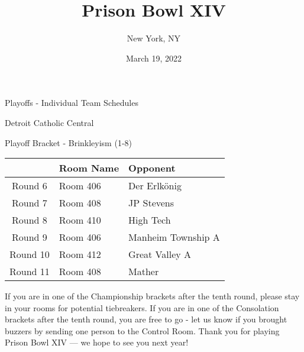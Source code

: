 \documentclass{article}%
\title{Prison Bowl XIV}%
\author{New York, NY}%
\date{March 19, 2022}%
\begin{document}
%
\normalsize%
%
\maketitle%
\vspace*{48pt}%
\begin{center}%
\begin{Huge}%
Playoffs {-} Individual Team Schedules%
\end{Huge}%
\end{center}%
\newpage%
\pagestyle{fancy}%
\fancyhf{}%
%
%
%
\begin{center}%
\begin{Huge}%
Detroit Catholic Central%
\end{Huge}%
\vspace*{12pt}%
\linebreak%
\begin{Large}%
Playoff Bracket {-} Brinkleyism (1{-}8)%
\end{Large}%
\end{center}%
\vspace*{4pt}%
%
\begin{tabularx}{\textwidth}{|c|Y|Y|}%
\hline%
&Room Name&Opponent\\%
\hline%
Round 6&Room 406&Der Erlkönig\\%
Round 7&Room 408&JP Stevens\\%
Round 8&Room 410&High Tech\\%
Round 9&Room 406&Manheim Township A\\%
Round 10&Room 412&Great Valley A\\%
Round 11&Room 408&Mather\\%
\hline%
\end{tabularx}%
\vspace*{30pt}%
\linebreak%
If you are in one of the Championship brackets after the tenth round, please stay in your rooms for potential tiebreakers.\newline%
\newline%
If you are in one of the Consolation brackets after the tenth round, you are free to go {-} let us know if you brought buzzers by sending one person to the Control Room.\newline%
\newline%
Thank you for playing Prison Bowl XIV — we hope to see you next year!\newline%
\end{document}
